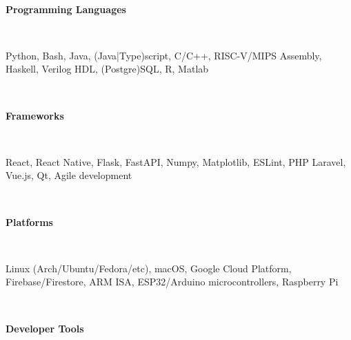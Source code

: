 \documentclass[letterpaper,10pt]{article}
\begin{document}
\begin{multicols*}{2}
  \vspace{.5em} \\
  \begin{large} \textbf{Programming Languages} \end{large} 
  \vspace{3px} \\ \indent
  \begin{minipage}{.45\textwidth}
    \begin{flushleft}
      Python, Bash, Java, (Java|Type)script, C/C++, RISC-V/MIPS Assembly, Haskell, Verilog HDL, (Postgre)SQL, R, Matlab
    \end{flushleft}
  \end{minipage}
  \vspace{.5em} \\
  \begin{large} \textbf{Frameworks} \end{large} 
  \vspace{3px} \\ \indent
  \begin{minipage}{.45\textwidth}
    \begin{flushleft}
      React, React Native, Flask, FastAPI, Numpy, Matplotlib, ESLint, PHP Laravel, Vue.js, Qt, Agile development
    \end{flushleft}
  \end{minipage}
  \vspace{.5em} \\
  \begin{large} \textbf{Platforms} \end{large}
  \vspace{3px} \\ \indent
  \begin{minipage}{.45\textwidth}
    \begin{flushleft}
      Linux (Arch/Ubuntu/Fedora/etc), macOS, Google Cloud Platform, Firebase/Firestore, ARM ISA, ESP32/Arduino microcontrollers, Raspberry Pi
    \end{flushleft}
  \end{minipage}
  \vspace{.5em} \\
  \begin{large} \textbf{Developer Tools} \end{large} 
  \vspace{3px} \\ \indent
  \begin{minipage}{.45\textwidth}

\end{minipage}
\end{multicols*}
\end{document}
